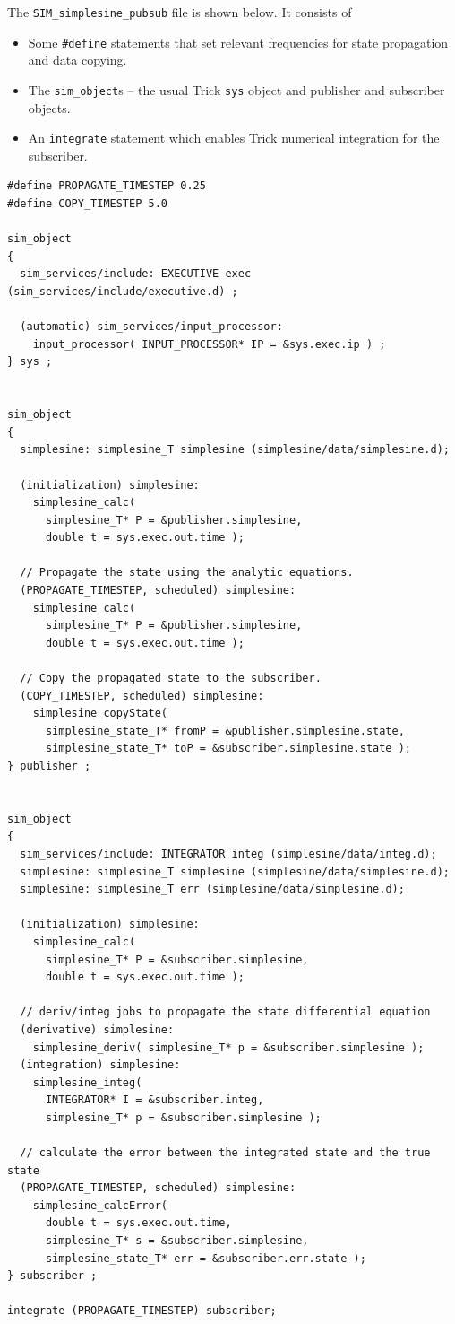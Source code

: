 The {\tt SIM\_simplesine\_pubsub} \sdefine file is shown below.  It consists of

\begin{itemize}
  \item{
    Some {\tt \#define} statements that set relevant frequencies for
    state propagation and data copying.
  }
  \item{
    The {\tt sim\_object}s -- the usual Trick {\tt sys} object and
    publisher and subscriber objects.
  }
  \item{
    An {\tt integrate} statement which enables Trick numerical integration
    for the subscriber.
  }
\end{itemize}

\begin{lstlisting}[caption={{\tt SIM\_simplesine\_pubsub} \sdefine file},label={list:SIM-pubsub-sdefine}]
#define PROPAGATE_TIMESTEP 0.25
#define COPY_TIMESTEP 5.0

sim_object
{
  sim_services/include: EXECUTIVE exec (sim_services/include/executive.d) ;

  (automatic) sim_services/input_processor:
    input_processor( INPUT_PROCESSOR* IP = &sys.exec.ip ) ;
} sys ;


sim_object
{
  simplesine: simplesine_T simplesine (simplesine/data/simplesine.d);

  (initialization) simplesine:
    simplesine_calc(
      simplesine_T* P = &publisher.simplesine,
      double t = sys.exec.out.time );

  // Propagate the state using the analytic equations.
  (PROPAGATE_TIMESTEP, scheduled) simplesine:
    simplesine_calc(
      simplesine_T* P = &publisher.simplesine,
      double t = sys.exec.out.time );

  // Copy the propagated state to the subscriber.
  (COPY_TIMESTEP, scheduled) simplesine:
    simplesine_copyState(
      simplesine_state_T* fromP = &publisher.simplesine.state,
      simplesine_state_T* toP = &subscriber.simplesine.state );
} publisher ;


sim_object
{
  sim_services/include: INTEGRATOR integ (simplesine/data/integ.d);
  simplesine: simplesine_T simplesine (simplesine/data/simplesine.d);
  simplesine: simplesine_T err (simplesine/data/simplesine.d);

  (initialization) simplesine:
    simplesine_calc(
      simplesine_T* P = &subscriber.simplesine,
      double t = sys.exec.out.time );

  // deriv/integ jobs to propagate the state differential equation
  (derivative) simplesine:
    simplesine_deriv( simplesine_T* p = &subscriber.simplesine );
  (integration) simplesine:
    simplesine_integ(
      INTEGRATOR* I = &subscriber.integ,
      simplesine_T* p = &subscriber.simplesine );

  // calculate the error between the integrated state and the true state
  (PROPAGATE_TIMESTEP, scheduled) simplesine:
    simplesine_calcError(
      double t = sys.exec.out.time,
      simplesine_T* s = &subscriber.simplesine,
      simplesine_state_T* err = &subscriber.err.state );
} subscriber ;

integrate (PROPAGATE_TIMESTEP) subscriber;
\end{lstlisting}
